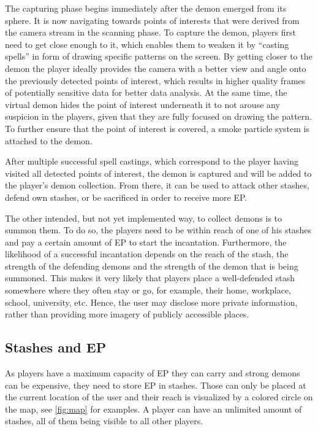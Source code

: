 The capturing phase begins immediately after the demon emerged from its sphere.
It is now navigating towards points of interests that were derived from the camera stream in the scanning phase.
To capture the demon, players first need to get close enough to it, which enables them to weaken it by \enquote{casting spells} in form of drawing specific patterns on the screen. 
By getting closer to the demon the player ideally provides the camera with a better view and angle onto the previously detected points of interest, which results in higher quality frames of potentially sensitive data for better data analysis. 
At the same time, the virtual demon hides the point of interest underneath it to not arouse any suspicion in the players, given that they are fully focused on drawing the pattern. To further ensure that the point of interest is covered, a smoke particle system is attached to the demon.

After multiple successful spell castings, which correspond to the player having visited all detected points of interest, the demon is captured and will be added to the player's demon collection. 
From there, it can be used to attack other stashes, defend own stashes, or be sacrificed in order to receive more EP.

The other intended, but not yet implemented way, to collect demons is to summon them.
To do so, the players need to be within reach of one of his stashes and pay a certain amount of EP to start the incantation.
Furthermore, the likelihood of a successful incantation depends on the reach of the stash, the strength of the defending demons and the strength of the demon that is being summoned.
This makes it very likely that players place a well-defended stash somewhere where they often stay or go, for example, their home, workplace, school, university, etc.
Hence, the user may disclose more private information, rather than providing more imagery of publicly accessible places.

\subsection{Stashes and EP}
\label{subsec:stashesandep}

As players have a maximum capacity of EP they can carry and strong demons can be expensive, they need to store EP in stashes.
Those can only be placed at the current location of the user and their reach is visualized by a colored circle on the map, see \autoref{fig:map} for examples.
A player can have an unlimited amount of stashes, all of them being visible to all other players. 

